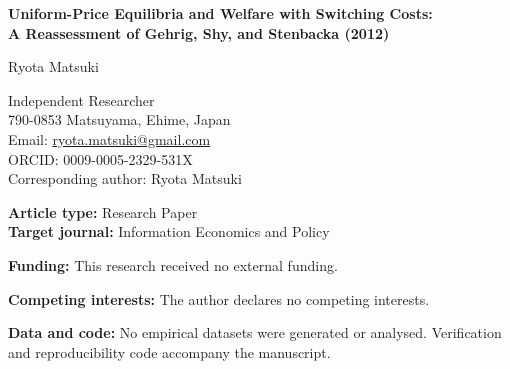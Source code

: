 \documentclass[11pt]{article}
\begin{document}
\thispagestyle{empty}

\begin{center}
{\Large\bfseries Uniform-Price Equilibria and Welfare with Switching Costs:\\
A Reassessment of Gehrig, Shy, and Stenbacka (2012)\par}

\vspace{1.5em}
{\large Ryota Matsuki\par}
\vspace{0.5em}
Independent Researcher\\
790-0853 Matsuyama, Ehime, Japan\\
Email: \href{mailto:ryota.matsuki@gmail.com}{ryota.matsuki@gmail.com}\\
ORCID: 0009-0005-2329-531X\\
Corresponding author: Ryota Matsuki
\end{center}

\vspace{2em}
\noindent\textbf{Article type:} Research Paper\\
\textbf{Target journal:} Information Economics and Policy

\vspace{1.5em}
\noindent\textbf{Funding:} This research received no external funding.

\medskip
\noindent\textbf{Competing interests:} The author declares no competing interests.

\medskip
\noindent\textbf{Data and code:} No empirical datasets were generated or analysed. Verification and reproducibility code accompany the manuscript.
\end{document}
